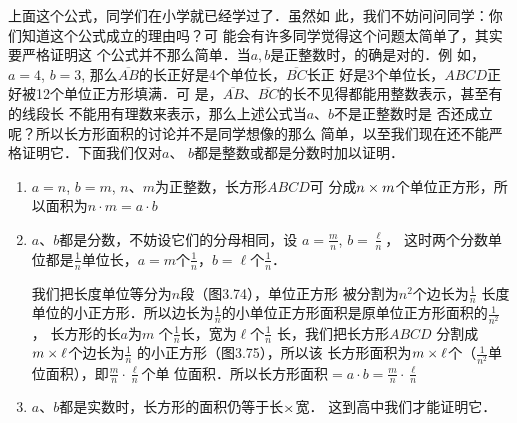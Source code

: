上面这个公式，同学们在小学就已经学过了．虽然如
此，我们不妨问问同学：你们知道这个公式成立的理由吗？可
能会有许多同学觉得这个问题太简单了，其实要严格证明这
个公式并不那么简单．当$a,b$是正整数时，的确是对的．例
如，$a=4$, $b=3$, 那么$\overline{AB}$的长正好是4个单位长，$\overline{BC}$长正
好是3个单位长，$ABCD$正好被12个单位正方形填满．可
是，$\overline{AB}$、$\overline{BC}$的长不见得都能用整数表示，甚至有的线段长
不能用有理数来表示，那么上述公式当$a$、$b$不是正整数时是
否还成立呢？所以长方形面积的讨论并不是同学想像的那么
简单，以至我们现在还不能严格证明它．下面我们仅对$a$、
$b$都是整数或都是分数时加以证明．

\begin{enumerate}
    \item  $a=n$, $b=m$, $n$、$m$为正整数，长方形$ABCD$可
    分成$n\times m$个单位正方形，所以面积为$n\cdot m=a\cdot b$
    \item  $a$、$b$都是分数，不妨设它们的分母相同，设
$a=\frac{m}{n}$, $b=\frac{\ell}{n}$，
    这时两个分数单位都是$\frac{1}{n}$单位长，$a=m$个$\frac{1}{n}$，$b=\ell$个$\frac{1}{n}$．

    我们把长度单位等分为$n$段（图3.74），单位正方形
    被分割为$n^2$个边长为$\frac{1}{n}$
    长度单位的小正方形．所以边长为$\frac{1}{n}$的小单位正方形面积是原单位正方形面积的$\frac{1}{n^2}$，
    长方形的长$a$为$m$
    个$\frac{1}{n}$长，宽为$\ell$个$\frac{1}{n}$
    长，我们把长方形$ABCD$
    分割成$m\times \ell$个边长为$\frac{1}{n}$
    的小正方形（图3.75），所以该
    长方形面积为$m\times\ell$个（$\frac{1}{n^2}$单位面积），即$\frac{m}{n}\cdot\frac{\ell}{n}$个单
    位面积．所以长方形面积$=a\cdot b=\frac{m}{n}\cdot\frac{\ell}{n}$
 \item $a$、$b$都是实数时，长方形的面积仍等于长$\times$宽．
    这到高中我们才能证明它．
\end{enumerate}




\begin{figure}[htp]\centering
    \begin{minipage}[t]{0.4\textwidth}
    \centering
{}
    \caption{}
    \end{minipage}
    \begin{minipage}[t]{0.55\textwidth}
    \centering
    \caption{}
    \end{minipage}
    \end{figure}


